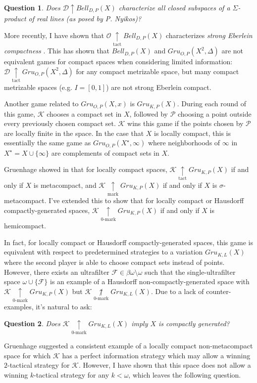 \documentclass[11pt]{amsart}
\theoremstyle{plain}
\newtheorem{question}{Question}
\newcommand{\win}{\uparrow}
\newcommand{\markwin}{\underset{\text{mark}}{\uparrow}}
\newcommand{\tactwin}{\underset{\text{tact}}{\uparrow}}
\newcommand{\kmarkwin}[1]{\underset{#1\text{-mark}}{\uparrow}}
\newcommand{\notkmarkwin}[1]{\underset{#1\text{-mark}}{\not\uparrow}}
\newcommand{\oneptcomp}[1]{#1^\star}
\newcommand{\gruConGame}[2]{Gru_{O,P}(#1,#2)}
\newcommand{\gruKPGame}[1]{Gru_{K,P}(#1)}
\newcommand{\gruKLGame}[1]{Gru_{K,L}(#1)}
\newcommand{\bellConGame}[1]{Bell_{D,P}(#1)}
\newcommand{\<}{\langle}
\renewcommand{\>}{\rangle}
\newcommand{\mc}[1]{\mathcal{#1}}
\newcommand{\pl}[1]{\mathscr{#1}}
\newcommand{\term}{\textit}
\begin{document}
\begin{question}
  Does $\pl D\win\bellConGame{X}$ characterize all closed subspaces of
  a $\Sigma$-product of real lines (as posed by P. Nyikos)?
\end{question}

More recently, I have shown that $\pl O\tactwin\bellConGame{X}$ characterizes
\term{strong Eberlein compactness} \cite{tacticProximal}. This has shown
that $\bellConGame{X}$ and $\gruConGame{X^2}{\Delta}$ are not equivalent
games for compact spaces when considering limited information:
$\pl D\tactwin\gruConGame{X^2}{\Delta}$ for any compact metrizable space,
but many
compact metrizable spaces (e.g. $I=[0,1]$) are not strong Eberlein compact.

Another game related to $\gruConGame{X}{x}$ is $\gruKPGame{X}$. During each
round of this game, $\pl K$ chooses a compact set in $X$, followed by
$\pl P$ choosing a point outside every previously chosen compact set. $\pl K$
wins this game if the points chosen by $\pl P$ are locally finite in the
space. In the case that $X$ is locally compact, this is essentially the
same game as $\gruConGame{\oneptcomp X}{\infty}$ where neighborhoods of
$\infty$ in $\oneptcomp X=X\cup\{\infty\}$ are complements of compact sets
in $X$.

Gruenhage showed in \cite{MR858337} that for locally compact spaces,
$\pl K\tactwin\gruKPGame{X}$ if and
only if $X$ is metacompact, and $\pl K\markwin\gruKPGame{X}$ if and only if
$X$ is $\sigma$-metacompact. I've extended this to show that for locally
compact or Hausdorff compactly-generated spaces,
$\pl K\kmarkwin0\gruKPGame{X}$ if and only if $X$ is hemicompact.

In fact, for
locally compact or Hausdorff compactly-generated spaces, this game is
equivalent with respect to predetermined strategies to a variation
$\gruKLGame{X}$ where the second player is able to choose compact sets
instead of points. However, there exists an ultrafilter
$\mc F\in\beta\omega\setminus\omega$ such that the single-ultrafilter space
$\omega\cup\{\mc F\}$
is an example of a Hausdorff non-compactly-generated space with
$\pl K\kmarkwin0\gruKPGame{X}$ but $\pl K\notkmarkwin0\gruKLGame{X}$. Due to a lack
of counter-examples, it's natural to ask:

\begin{question}
  Does $\pl K\kmarkwin0\gruKLGame{X}$ imply $X$ is compactly generated?
\end{question}

Gruenhage suggested a consistent example of a locally compact non-metacompact
space for which $\pl K$ has a perfect information strategy which may allow
a winning $2$-tactical strategy for $\pl K$. However, I have shown that this
space does not allow a winning $k$-tactical strategy for any $k<\omega$, which
leaves the following question.
\end{document}
